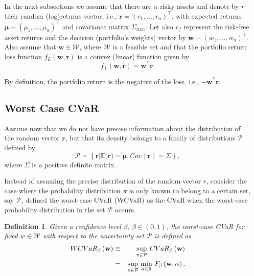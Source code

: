 \documentclass[a4paper,10pt]{article}
\newtheorem{definition}{Definition}
\begin{document}
In the next subsections we assume that there are $n$ risky assets and denote by $r$ their random (log)returns vector, i.e., $\mathbf{r}\mathbf{=}\left(r_{1},\ldots,r_{n}\right)^{\top }$, with expected returns $\mathbf{\mu }\mathbf{=}\left( \mu _{1},...,\mu _{n}\right) ^{\top }$ and covariance matrix $\Sigma _{nxn}$. Let also $r_{f}$ represent the risk-free asset
returns and the decision (portfolio's weights) vector by $\mathbf{w}\mathbf{=}\left( w_{1},...,w_{n}\right) ^{\top }$. Also assume that $\mathbf{w}\in \mathcal{W}$, where $\mathcal{W}$ is a feasible set and that the portfolio return loss function $f_{L}\left( \mathbf{w,r}\right) $ is a convex (linear) function given by
\begin{equation*}
f_{L}(\mathbf{w},\mathbf{r})=\mathbf{w}^{^{\top }}\mathbf{r}\text{.}
\end{equation*}

By definition, the portfolio return is the negative of the loss, i.e., $-\mathbf{w}^{^{\top }}\mathbf{r}$.

\subsection{Worst Case CVaR}

Assume now that we do not have precise information about the distribution of the random vector $\mathbf{r}$, but that its density belongs to a family of distributions $\mathcal{P}$ defined by
\begin{equation}
\mathcal{P=}\left\{ \mathbf{r}\left\vert \mathbb{E(}\mathbf{r})=\mathbf{\mu }
,Cov(\mathbf{r})=\Sigma \right. \right\},  \label{13b}
\end{equation}
where $\Sigma$ is a positive definite matrix.

Instead of assuming the precise distribution of the random vector $r$, \citet*{zhu2009worst} consider the case where the probability distribution $\pi$ is only known to belong to a certain set, say $\mathcal{P}$, defined the worst-case CVaR (WCVaR) as the CVaR when the worst-case probability distribution in the set $\mathcal{P}$ occurs.

\bigskip

\begin{definition}
	Given a confidence level $\beta$, $\beta \in (0,1)$, the worst-case CVaR for fixed $w\in \mathcal{W}$ with respect to the uncertainty set $\mathcal{P}$ is defined as
	\begin{eqnarray}
	WCVaR_{\beta }\left( \mathbf{w}\right) &\equiv &\underset{\pi \in \mathcal{P}}{\sup }~ CVaR_{\beta }\left( \mathbf{w}\right)  \notag \\
	&=&\underset{\pi \in \mathcal{P}}{\sup }~\underset{\alpha \in
		\mathbb{R}}{\min }~F_{\beta }\left(\mathbf{w},\alpha \right).  \label{14}
	\end{eqnarray}
\end{definition}
\end{document}
